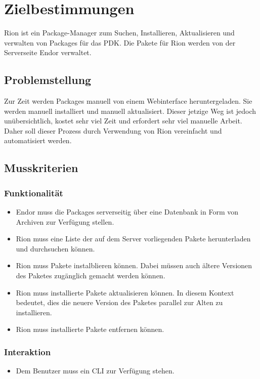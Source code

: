 \chapter{Zielbestimmungen}

Rion ist ein Package-Manager zum Suchen, Installieren, Aktualisieren und verwalten von Packages für das PDK. Die Pakete für Rion werden von der Serverseite Endor verwaltet.

\section{Problemstellung}
Zur Zeit werden Packages manuell von einem Webinterface heruntergeladen. Sie werden manuell installiert und manuell aktualisiert. Dieser jetzige Weg ist jedoch unübersichtlich, kostet sehr viel Zeit und erfordert sehr viel manuelle Arbeit. Daher soll dieser Prozess durch Verwendung von Rion vereinfacht und automatisiert werden.

\section{Musskriterien}
\subsection{Funktionalität}
\begin{itemize}
		\item Endor muss die Packages serverseitig über eine Datenbank in Form von Archiven zur Verfügung stellen.
		\item Rion muss eine Liste der auf dem Server vorliegenden Pakete herunterladen und durchsuchen können.
		\item Rion muss Pakete instalblieren können. Dabei müssen auch ältere Versionen des Paketes zugänglich gemacht werden können.
		\item Rion muss installierte Pakete aktualisieren können. In diesem Kontext bedeutet, dies die neuere Version des Paketes parallel zur Alten zu installieren.
		\item Rion muss installierte Pakete entfernen können.
\end{itemize}

\subsection{Interaktion}


\begin{itemize}
	\item Dem Benutzer muss ein CLI zur Verfügung stehen.
\end{itemize}

